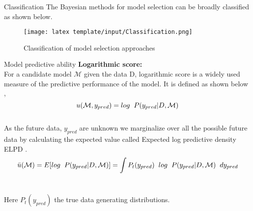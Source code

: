\documentclass[t, aspectratio=169]{beamer}
\begin{document}
 \begin{frame}{Classification}
 \vspace{1cm}
 The Bayesian methods for model selection can be broadly classified as shown below.
  \vspace{1cm}
 \begin{figure}
 \texttt{[image: latex template/input/Classification.png]}
 \caption{Classification of model selection approaches \cite{Vehtari}}
 \end{figure}

 \end{frame} 
 

 
 \begin{frame}{Model predictive ability}
 \vspace{0.7cm}
 \textbf{Logarithmic score:}\\
\vspace{0.5cm}
For a candidate model \(\mathcal{M}\)   given the data D, logarithmic score is a widely used measure of the predictive performance of the model. It is defined as shown below \cite{Vehtari},\\

\[u(\mathcal{M},y_{pred}) = log\hspace{0.2cm}  P(y_{pred}|D,\mathcal{M} )\]\\
 \vspace{0.5cm}
As the future data, \(y_{pred}\) are unknown we marginalize over all the possible future data by calculating the expected value called Expected log predictive density ELPD \cite{ELPD}.
\[\bar{u}(\mathcal{M}) = E[log\hspace{0.2cm}  P(y_{pred}|D,\mathcal{M} )] = \int P_t(y_{pred}) \hspace{0.2cm} log\hspace{0.2cm}  P(y_{pred}|D,\mathcal{M} ) \hspace{0.2cm} dy_{pred}\]\\

 \vspace{0.5cm}
 
 Here \(P_t(y_{pred})\) the true data generating distributions.

 \end{frame} 


\end{document}
